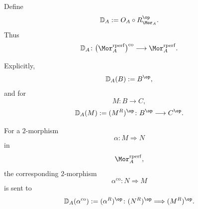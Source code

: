 \begin{definition}
\label{def:canonical-morita-duality}
Define
\[
    \mathbb D_A
    :=
    O_A\circ R_{\Mor_A}^{\op}.
\]
Thus
\[
    \mathbb D_A
    \colon
    \bigl(
        \Mor_A^{\mathrm{rperf}}
    \bigr)^{\mathrm{co}}
    \longrightarrow
    \Mor_A^{\mathrm{rperf}}.
\]

Explicitly,
\[
    \mathbb D_A(B)
    :=
    B^{\op},
\]
and for
\[
    M
    \colon
    B
    \longrightarrow
    C,
\]
\[
    \mathbb D_A(M)
    :=
    (M^R)^{\op}
    \colon
    B^{\op}
    \longrightarrow
    C^{\op}.
\]

For a $2$-morphism
\[
    \alpha
    \colon
    M
    \Longrightarrow
    N
\]
in
\[
    \Mor_A^{\mathrm{rperf}},
\]
the corresponding $2$-morphism
\[
    \alpha^{\mathrm{co}}
    \colon
    N
    \Longrightarrow
    M
\]
is sent to
\[
    \mathbb D_A(\alpha^{\mathrm{co}})
    :=
    (\alpha^R)^{\op}
    \colon
    (N^R)^{\op}
    \Longrightarrow
    (M^R)^{\op}.
\]
\end{definition}

